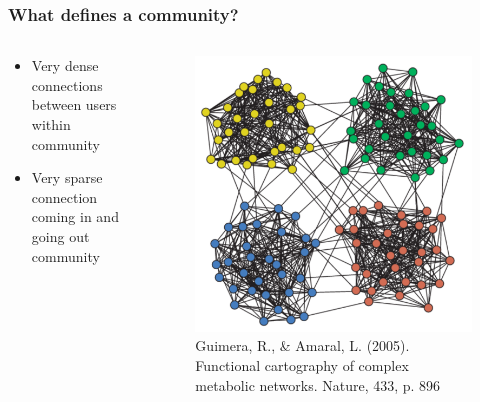 \documentclass{beamer}
\begin{document}

\begin{frame}
\frametitle{What defines a community?}
\begin{columns}
	\begin{column}{0.47\textwidth}
		\begin{itemize}
			\item Very dense connections between users within community
			\vspace{1cm}
			\item Very sparse connection coming in and going out community
		\end{itemize}
	\end{column}
	\begin{column}{0.5\textwidth}
		\begin{figure}
		\centering
			\includegraphics[width=1\linewidth]{figures/communities}
		\caption{\tiny Guimera, R., \& Amaral, L. (2005). Functional cartography of complex metabolic networks. Nature, 433, p. 896}
		\end{figure}
	\end{column}
\end{columns}

\end{frame}

\end{document}
